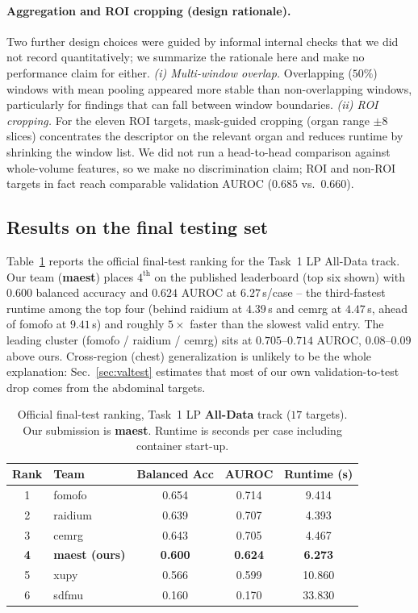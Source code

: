\documentclass[runningheads]{llncs}
\begin{document}
\paragraph{Aggregation and ROI cropping (design rationale).}
Two further design choices were guided by informal internal checks that we did
not record quantitatively; we summarize the rationale here and make no
performance claim for either.
\emph{(i) Multi-window overlap.} Overlapping ($50\%$) windows with mean pooling
appeared more stable than non-overlapping windows, particularly for findings that can
fall between window boundaries.
\emph{(ii) ROI cropping.} For the eleven ROI targets, mask-guided cropping
(organ range $\pm 8$ slices) concentrates the descriptor on the relevant organ
and reduces runtime by shrinking the window list. We did not run a head-to-head
comparison against whole-volume features, so we make no discrimination claim;
ROI and non-ROI targets in fact reach comparable validation AUROC
($0.685$ vs.\ $0.660$).

\subsection{Results on the final testing set}
\label{sec:test}
Table~\ref{tab:leaderboard} reports the official final-test ranking for the
Task~1 LP All-Data track. Our team (\textbf{maest}) places $4^{\text{th}}$ on the
published leaderboard (top six shown)
with $0.600$ balanced accuracy and $0.624$ AUROC at $6.27$\,s/case -- the
third-fastest runtime among the top four (behind raidium at $4.39$\,s and cemrg
at $4.47$\,s, ahead of fomofo at $9.41$\,s) and roughly $5\times$ faster than the
slowest valid entry. The leading cluster (fomofo / raidium / cemrg) sits at
$0.705$--$0.714$ AUROC, $0.08$--$0.09$ above ours. Cross-region (chest)
generalization is unlikely to be the whole explanation: Sec.~\ref{sec:valtest}
estimates that most of our own validation-to-test drop comes from the abdominal
targets.

\begin{table}[htbp]
\caption{Official final-test ranking, Task~1 LP \textbf{All-Data} track ($17$
targets). Our submission is \textbf{maest}. Runtime is seconds per case including
container start-up.}\label{tab:leaderboard}
\centering
\begin{tabular}{clccc}
\hline
Rank & Team & Balanced Acc & AUROC & Runtime (s) \\ \hline
1 & fomofo            & 0.654 & 0.714 & 9.414 \\
2 & raidium           & 0.639 & 0.707 & 4.393 \\
3 & cemrg             & 0.643 & 0.705 & 4.467 \\
\textbf{4} & \textbf{maest (ours)} & \textbf{0.600} & \textbf{0.624} & \textbf{6.273} \\
5 & xupy              & 0.566 & 0.599 & 10.860 \\
6 & sdfmu             & 0.160 & 0.170 & 33.830 \\ \hline
\end{tabular}
\end{table}
\end{document}
